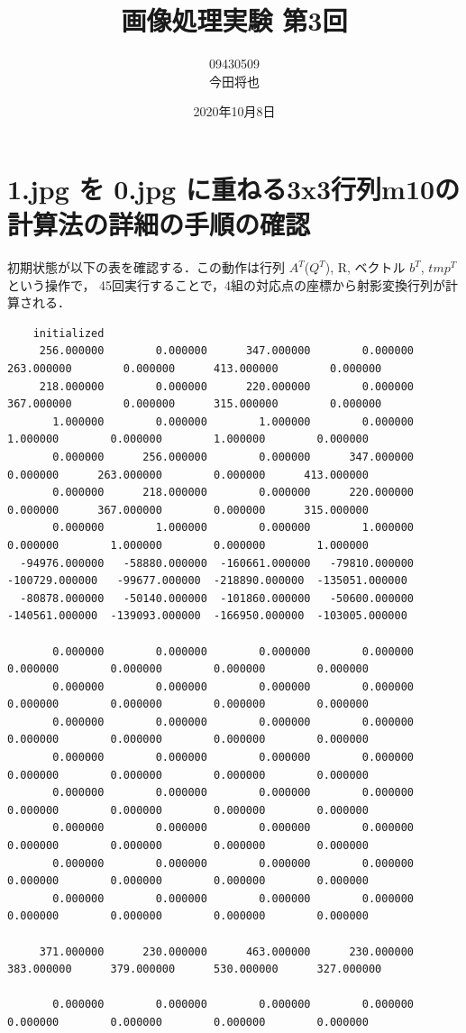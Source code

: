 \documentclass[11pt]{jarticle}
\begin{document}
\title{画像処理実験 第3回}
\author{09430509\\今田将也}
\date{2020年10月8日}
\maketitle

\section{1.jpg を 0.jpg に重ねる3x3行列m10の計算法の詳細の手順の確認}
初期状態が以下の表を確認する．この動作は行列 $A^{T}$($Q^{T}$), R, ベクトル $b^{T}$, $tmp^{T}$という操作で，
45回実行することで，4組の対応点の座標から射影変換行列が計算される．

\tiny
\begin{verbatim}
    initialized
     256.000000        0.000000      347.000000        0.000000      263.000000        0.000000      413.000000        0.000000 
     218.000000        0.000000      220.000000        0.000000      367.000000        0.000000      315.000000        0.000000 
       1.000000        0.000000        1.000000        0.000000        1.000000        0.000000        1.000000        0.000000 
       0.000000      256.000000        0.000000      347.000000        0.000000      263.000000        0.000000      413.000000 
       0.000000      218.000000        0.000000      220.000000        0.000000      367.000000        0.000000      315.000000 
       0.000000        1.000000        0.000000        1.000000        0.000000        1.000000        0.000000        1.000000 
  -94976.000000   -58880.000000  -160661.000000   -79810.000000  -100729.000000   -99677.000000  -218890.000000  -135051.000000 
  -80878.000000   -50140.000000  -101860.000000   -50600.000000  -140561.000000  -139093.000000  -166950.000000  -103005.000000 

       0.000000        0.000000        0.000000        0.000000        0.000000        0.000000        0.000000        0.000000 
       0.000000        0.000000        0.000000        0.000000        0.000000        0.000000        0.000000        0.000000 
       0.000000        0.000000        0.000000        0.000000        0.000000        0.000000        0.000000        0.000000 
       0.000000        0.000000        0.000000        0.000000        0.000000        0.000000        0.000000        0.000000 
       0.000000        0.000000        0.000000        0.000000        0.000000        0.000000        0.000000        0.000000 
       0.000000        0.000000        0.000000        0.000000        0.000000        0.000000        0.000000        0.000000 
       0.000000        0.000000        0.000000        0.000000        0.000000        0.000000        0.000000        0.000000 
       0.000000        0.000000        0.000000        0.000000        0.000000        0.000000        0.000000        0.000000 

     371.000000      230.000000      463.000000      230.000000      383.000000      379.000000      530.000000      327.000000 

       0.000000        0.000000        0.000000        0.000000        0.000000        0.000000        0.000000        0.000000 
\end{verbatim}
\end{document}
